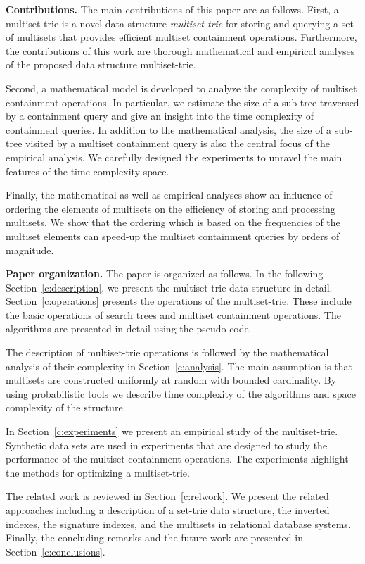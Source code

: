 \medskip\noindent\textbf{Contributions.}\;
The main contributions of this paper are as follows. First, a  multiset-trie is a novel data structure \emph{multiset-trie} for storing and querying a set of multisets that provides efficient multiset containment operations. Furthermore, the contributions of this work are thorough mathematical and empirical analyses of the proposed data structure multiset-trie. 

Second, a mathematical model is developed to analyze the complexity of multiset containment operations. In particular, we estimate the size of a sub-tree traversed by a containment query and give an insight into the time complexity of containment queries. 
In addition to the mathematical analysis, the size of a sub-tree visited by a multiset containment query is also the central focus of the empirical analysis. We carefully designed the experiments to unravel the main features of the time complexity space. 

Finally, the mathematical as well as empirical analyses show an influence of ordering the elements of multisets on the efficiency of storing and processing multisets. We show that the ordering which is based on the frequencies of the multiset elements can speed-up the multiset containment queries by orders of magnitude.

\medskip\noindent\textbf{Paper organization.}\; 
The paper is organized as follows. In the following Section~\ref{c:description}, we present the multiset-trie data structure in detail.
Section~\ref{c:operations} presents the operations of the multiset-trie. These include the basic operations of search trees and multiset containment operations. The algorithms are presented in detail using the pseudo code. 

The description of multiset-trie operations is followed by the mathematical analysis of their complexity in Section~\ref{c:analysis}. The main assumption is that multisets are constructed uniformly at random with bounded cardinality. By using probabilistic tools we describe time complexity of the algorithms and space complexity of the structure.

In Section~\ref{c:experiments} we present an empirical study of the multiset-trie. Synthetic data sets are used in experiments that are designed to study the performance of the multiset containment operations. The experiments highlight the methods for optimizing a multiset-trie. 

The related work is reviewed in Section~\ref{c:relwork}. We present the related approaches including a description of a set-trie data structure, the inverted indexes, the signature indexes, and the multisets in relational database systems. Finally, the concluding remarks and the future work are presented in Section~\ref{c:conclusions}.

